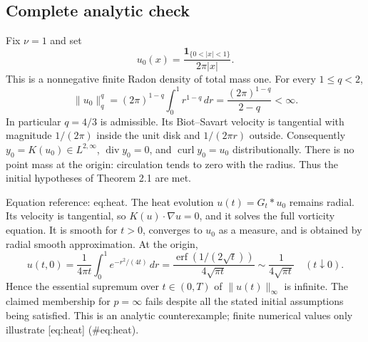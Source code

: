 \documentclass[10pt]{article}
\begin{document}
\subsection*{Complete analytic check}
Fix \(\nu=1\) and set \[u_0(x)=\frac{\mathbf 1_{\{0<|x|<1\}}}{2\pi |x|}.\] This is a nonnegative finite Radon density of total mass one. For every \(1\le q<2\), \[\|u_0\|_q^q=(2\pi)^{1-q}\int_0^1 r^{1-q}\,dr
 =\frac{(2\pi)^{1-q}}{2-q}<\infty.\] In particular \(q=4/3\) is admissible. Its Biot–Savart velocity is tangential with magnitude \(1/(2\pi)\) inside the unit disk and \(1/(2\pi r)\) outside. Consequently \(y_0=K(u_0)\in L^{2,\infty}\), \(\operatorname{div}y_0=0\), and \(\operatorname{curl}y_0=u_0\) distributionally. There is no point mass at the origin: circulation tends to zero with the radius. Thus the initial hypotheses of Theorem 2.1 are met.\par
Equation reference: eq:heat. The heat evolution \(u(t)=G_t*u_0\) remains radial. Its velocity is tangential, so \(K(u)\cdot\nabla u=0\), and it solves the full vorticity equation. It is smooth for \(t>0\), converges to \(u_0\) as a measure, and is obtained by radial smooth approximation. At the origin, \[
 u(t,0)=\frac{1}{4\pi t}\int_0^1 e^{-r^2/(4t)}\,dr
       =\frac{\operatorname{erf}(1/(2\sqrt t))}{4\sqrt{\pi t}}
       \sim\frac{1}{4\sqrt{\pi t}}\quad(t\downarrow0).\] Hence the essential supremum over \(t\in(0,T)\) of \(\|u(t)\|_\infty\) is infinite. The claimed membership for \(p=\infty\) fails despite all the stated initial assumptions being satisfied. This is an analytic counterexample; finite numerical values only illustrate [eq:heat] (\#eq:heat).\par
\end{document}
